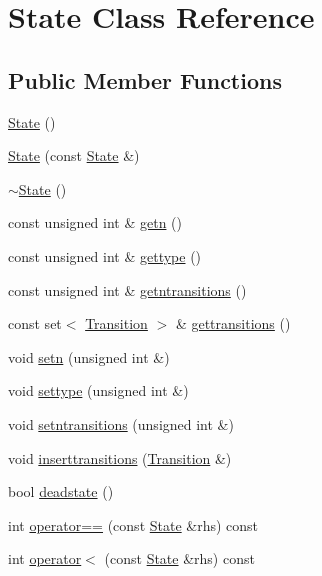 \hypertarget{classState}{}\section{State Class Reference}
\label{classState}
\subsection*{Public Member Functions}
\begin{DoxyCompactItemize}
\item 
\hyperlink{classState_ab91bb1dd5aa6260ab2a456581daf9ec2}{State} ()
\item 
\hyperlink{classState_a5ca97340266d486dfa42225f19c40de3}{State} (const \hyperlink{classState}{State} \&)
\item 
\hyperlink{classState_afab438d92b90dc18d194dbd9c9c8bab3}{$\sim$\+State} ()
\item 
const unsigned int \& \hyperlink{classState_ac045d201c81b6ea1ff3da734c6e286a7}{getn} ()
\item 
const unsigned int \& \hyperlink{classState_ad701488d3ba934847dcea6222d65719e}{gettype} ()
\item 
const unsigned int \& \hyperlink{classState_ac6d5a2e94f19b88ef932f84380420b35}{getntransitions} ()
\item 
const set$<$ \hyperlink{classTransition}{Transition} $>$ \& \hyperlink{classState_aaafb1d7a01590d4b2ff055ca31028d65}{gettransitions} ()
\item 
void \hyperlink{classState_af336de67e76fd18020cd363f82a2172e}{setn} (unsigned int \&)
\item 
void \hyperlink{classState_af24ca7913f14e5e73bcead784b4f322d}{settype} (unsigned int \&)
\item 
void \hyperlink{classState_aae392034fc0fdf25307007548f5076d6}{setntransitions} (unsigned int \&)
\item 
void \hyperlink{classState_af93c774d8cbb27b81f2c86a0036f32d2}{inserttransitions} (\hyperlink{classTransition}{Transition} \&)
\item 
bool \hyperlink{classState_ab13a676e36927c127c62dba45ad7b635}{deadstate} ()
\item 
int \hyperlink{classState_a55af9b5ad46af51c0f5ccc8e8065ae36}{operator==} (const \hyperlink{classState}{State} \&rhs) const 
\item 
int \hyperlink{classState_a902896a66d8d92911a3e208038506892}{operator$<$} (const \hyperlink{classState}{State} \&rhs) const 
\end{DoxyCompactItemize}
